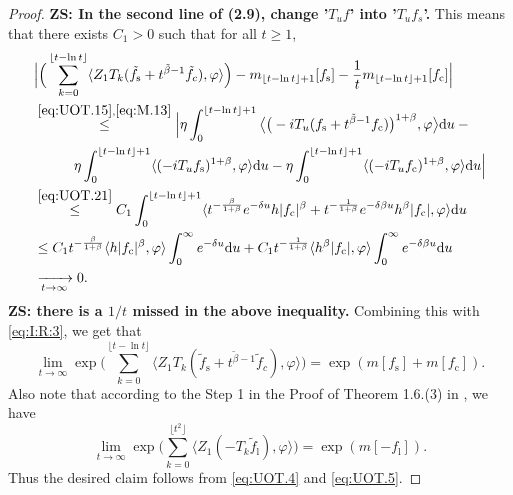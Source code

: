 \documentclass[12pt,a4paper]{amsart}
\theoremstyle{plain}
\theoremstyle{definition}
\numberwithin{equation}{section}
\begin{document}
\begin{proof}
{\bf ZS: In the second line of (2.9), change ’$T_uf$’ into ’$T_uf_s$’.}
	This means that there exists $C_1 >0$ such that for all $t\geq 1$,
\begin{align}
	&\Big|\Big(\sum_{k=0}^{\lfloor t-\ln t \rfloor} \langle Z_1T_{k}(\tilde f_\mathrm s+t^{\tilde{\beta}-1}\tilde{f}_c), \varphi\rangle \Big)-m_{\lfloor t-\ln t \rfloor+1}[f_\mathrm s]-\frac{1}{t}m_{\lfloor t-\ln t \rfloor+1}[f_\mathrm c]\Big|
	\\&
\begin{multlined}
	\overset{\eqref{eq:UOT.15},\eqref{eq:M.13}}\leq\Big| \eta \int_0^{\lfloor t-\ln t \rfloor+1}\big\langle \big(-iT_u(f_\mathrm s+t^{\tilde{\beta}-1}f_\mathrm c)\big)^{1+\beta},\varphi \big\rangle \mathrm du - {}
	\\ \eta \int_0^{\lfloor t-\ln t \rfloor+1} \langle (-iT_u f_\mathrm s)^{1+\beta}, \varphi \rangle  \mathrm du - \eta \int_0^{\lfloor t-\ln t \rfloor+1} \langle (-iT_u f_\mathrm c)^{1+\beta}, \varphi \rangle  \mathrm du\Big|
\end{multlined}
	\\ & \overset{\eqref{eq:UOT.21}}\leq C_1\int_0^{\lfloor t-\ln t \rfloor+1}\langle t^{-\frac{\beta}{1+\beta}}e^{-\delta u}h|f_\mathrm c|^{\beta}+t^{-\frac{1}{1+\beta}}e^{-\delta\beta u}h^{\beta}|f_\mathrm c|, \varphi \rangle \mathrm du
	\\& \leq C_1 t^{-\frac{\beta}{1+\beta}} \langle h|f_\mathrm c|^{\beta},\varphi \rangle \int_0^\infty e^{-\delta u} \mathrm du + C_1 t^{-\frac{1}{1+\beta}} \langle h^\beta|f_\mathrm c|,\varphi \rangle \int_0^\infty e^{-\delta \beta u} \mathrm du
	\\& \xrightarrow[t\rightarrow \infty]{} 0.
\end{align}
{\bf ZS: there is a $1/t$ missed in the above inequality.}
	Combining this with \eqref{eq:I:R:3}, we get that
\begin{equation}
\label{eq:UOT.4}
	\lim_{t\rightarrow \infty}\exp\Big(\sum_{k=0}^{\lfloor t-\ln t \rfloor} \langle Z_1T_{k}(\tilde f_\mathrm s+t^{\tilde{\beta}-1}\tilde{f}_c), \varphi\rangle \Big)  = \exp( m[f_\mathrm s]+m[f_\mathrm c]).
\end{equation}
	Also note that according to the Step 1 in the Proof of Theorem 1.6.(3) in \cite{RenSongSunZhao2019Stable}, we have
\begin{equation}
\label{eq:UOT.5}
	\lim_{t\rightarrow \infty}\exp\Big(\sum_{k=0}^{\lfloor t^2 \rfloor}\langle Z_1(-T_k\tilde{f}_\mathrm l),\varphi\rangle\Big) =\exp(m[-f_\mathrm l]).
\end{equation}
	Thus the desired claim follows from \eqref{eq:UOT.4} and \eqref{eq:UOT.5}.
\end{proof}
\end{document}
